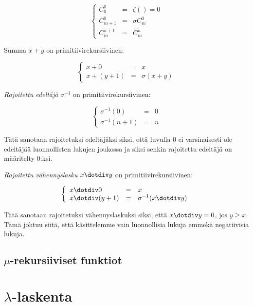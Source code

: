 \documentclass[a4paper]{article}
\begin{document}
\begin{equation}
\left\{
\begin{array}{lcl}
C_0^0 & = & \zeta()=0 \\
C_{m+1}^0 & = & \sigma C_{m}^0 \\
C_m^{n+1} & = & C_m^n
\end{array}
\right.
\end{equation}

Summa $x+y$ on primitiivirekursiivinen:

\begin{equation}
\left\{
\begin{array}{lcl}
x + 0 & = & x \\
x + (y+1) & = & \sigma(x + y)
\end{array}
\right.
\end{equation}

\emph{Rajoitettu edeltäjä} $\sigma^{-1}$ on primitiivirekursiivinen:

\begin{equation}
\left\{
\begin{array}{lcl}
\sigma^{-1}(0) & = & 0 \\
\sigma^{-1}(n+1) & = & n
\end{array}
\right.
\end{equation}

Tätä sanotaan rajoitetuksi edeltäjäksi siksi, että luvulla $0$ ei varsinaisesti
ole edeltäjää luonnollisten lukujen joukossa ja siksi senkin rajoitettu edeltäjä
on määritelty $0$:ksi.

\emph{Rajoitettu vähennyslasku} $x \dotdiv y$ on primitiivirekursiivinen:

\begin{equation}
\left\{
\begin{array}{lcl}
x \dotdiv 0 & = & x \\
x \dotdiv (y+1) & = & \sigma^{-1}(x \dotdiv y)
\end{array}
\right.
\end{equation}

Tätä sanotaan rajoitetuksi vähennyslaskuksi siksi, että $x \dotdiv y=0$, jos $y \ge x$.
Tämä johtuu siitä, että käsittelemme vain luonnollisia lukuja emmekä negatiivisia
lukuja.

\subsection{$\mu$-rekursiiviset funktiot}

\section{$\lambda$-laskenta}
\end{document}
